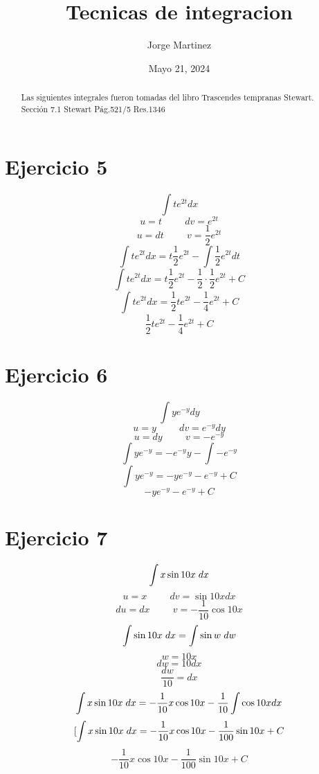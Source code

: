 \documentclass{amsart}
\begin{document}
\title{Tecnicas de integracion}
\author{Jorge Martinez}
\address{Universidad de San Carlos de Guatemala\\ Facultad de ingenieria}
\date{Mayo 21, 2024}
\begin{abstract}
Las siguientes integrales fueron tomadas del libro Trascendes tempranas Stewart. \\
Sección 7.1 Stewart Pág.521/5 Res.1346
\end{abstract}

\maketitle

\section{Ejercicio 5}\label{S:ejercicio 5}

    \[\int te^{2t} dx\]
    \[ u = t \hspace{1cm} dv=e^{2t}\]
    \[ u = dt \hspace{1cm} v = \frac{1}{2}e^{2t}\]
    \[\int te^{2t} dx = t\frac{1}{2}e^{2t} - \int \frac{1}{2}e^{2t} dt\]
    \[\int te^{2t} dx = t\frac{1}{2}e^{2t} - \frac{1}{2}\cdot\frac{1}{2}e^{2t} + C\]
    \[\int te^{2t} dx = \frac{1}{2}te^{2t} - \frac{1}{4}e^{2t} + C\]
    \[\frac{1}{2}te^{2t} - \frac{1}{4}e^{2t} + C\]
    
    
    
\section{Ejercicio 6}

    \[\int ye^{-y} dy\]
    \[u = y \hspace{1cm} dv = e^{-y} dy\]
    \[u = dy \hspace{1cm} v = -e^{-y}\]
    \[\int ye^{-y} = -e^{-y}y - \int -e^{-y}\]
    \[\int ye^{-y} = -ye^{-y} -e^{-y} + C\]
    \[-ye^{-y} -e^{-y} + C\]
    
\section{Ejercicio 7}

    \[\int x\sin{10x} \hspace{1mm} dx\]
    \[ u = x \hspace{1cm} dv = \sin{10x} dx\]
    \[ du = dx \hspace{1cm} v = -\frac{1}{10}\cos{10x}\]
    \[\int \sin{10x} \hspace{1mm} dx = \int \sin{w} \hspace{1mm} dw\]
    \[w = 10x\]
    \[dw = 10 dx\]
    \[\frac{dw}{10} = dx\]
    \[\int x\sin{10x} \hspace{1mm} dx = -\frac{1}{10}x\cos{10x} - \frac{1}{10}\int \cos{10x} dx\]
    \[[\int x\sin{10x} \hspace{1mm} dx = -\frac{1}{10}x\cos{10x} - \frac{1}{100}\sin{10x} + C\]
    \[-\frac{1}{10}x\cos{10x} - \frac{1}{100}\sin{10x} + C\]
    
\end{document}
